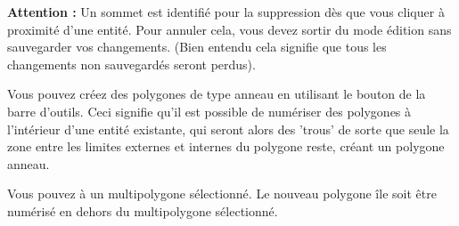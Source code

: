 \textbf{Attention :} Un sommet est identifi\'e pour la suppression d\`es que vous cliquer \`a proximit\'e d'une entit\'e. Pour annuler cela, vous devez sortir du mode \'edition sans sauvegarder vos changements. (Bien entendu cela signifie que tous les changements non sauvegard\'es seront perdus).


Vous pouvez cr\'eez des polygones de type anneau en utilisant le bouton  de la barre d'outils. Ceci signifie qu'il est possible de num\'eriser des polygones \`a l'int\'erieur d'une entit\'e existante, qui seront alors des 'trous' de sorte que seule la zone entre les limites externes et internes du polygone reste, cr\'eant un polygone anneau.



Vous pouvez  \`a un multipolygone s\'electionn\'e. Le nouveau polygone \^ile soit \^etre num\'eris\'e en dehors du multipolygone s\'electionn\'e.



